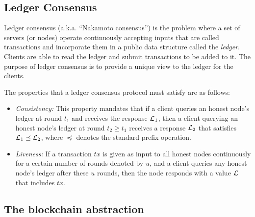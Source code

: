 \subsection{Ledger Consensus}
Ledger consensus (a.k.a. ``Nakamoto consensus'') is the problem where a set of servers
(or nodes) operate continuously accepting inputs
that are called transactions and incorporate them in a public data 
structure called the {\em ledger}. Clients are able to read the ledger
and submit transactions to be
added to it.
The purpose of ledger consensus is to provide a unique
view to the ledger for the clients. 

The properties that a ledger consensus protocol must satisfy are as follows:

\begin{itemize}

\item {\em Consistency:} This property mandates that if a client queries
an honest node's ledger at round $t_1$  
and receives the response $\mathcal{L}_1$, 
then a client querying an honest node's ledger at round $t_2\geq t_1 $
 receives a response $\mathcal{L}_2$ that satisfies $\mathcal{L}_1 \preceq \mathcal{L}_2$, 
where $\preceq$ denotes the standard prefix operation. 

\item {\em Liveness:} If a transaction $tx$ is given as input to all honest
nodes continuously for a certain number of rounds denoted by $u$, 
and a client queries any honest node's ledger
after these $u$ rounds, then the node responds with a value
$\mathcal{L}$ that includes $tx$.

\end{itemize}


\subsection{The blockchain abstraction}\label{se:bcabstraction}

